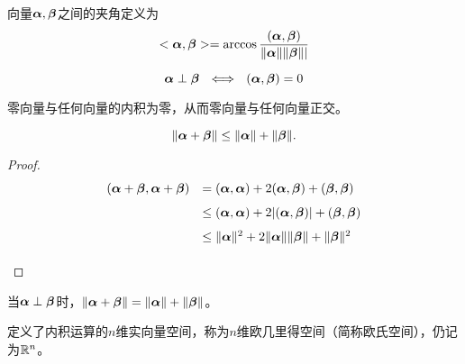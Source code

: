 \begin{frame}\ft{\secname}

\begin{dingyi}[向量之间的夹角]
  向量$\boldsymbol{\alpha},\boldsymbol{\beta}$之间的夹角定义为
  $$
  <\boldsymbol{\alpha},\boldsymbol{\beta}>=\arccos\frac{(\boldsymbol{\alpha},\boldsymbol{\beta})}{\|\boldsymbol{\alpha}\|\|\boldsymbol{\beta}\||}
  $$
\end{dingyi}
\end{frame}

\begin{frame}\ft{\secname}

\begin{dingli}
  $$\boldsymbol{\alpha}\perp\boldsymbol{\beta} ~~\Longleftrightarrow~~
  (\boldsymbol{\alpha},\boldsymbol{\beta})=0
  $$
\end{dingli}

\begin{zhu}
零向量与任何向量的内积为零，从而零向量与任何向量正交。
\end{zhu}
\end{frame}

\begin{frame}\ft{\secname}

\begin{dingli}[三角不等式]
  $$
  \|\boldsymbol{\alpha}+\boldsymbol{\beta}\|\le\|\boldsymbol{\alpha}\|+\|\boldsymbol{\beta}\|.
  $$
\end{dingli}\pause 
\begin{proof}
$$
\begin{array}{rl}
  (\boldsymbol{\alpha}+\boldsymbol{\beta},\boldsymbol{\alpha}+\boldsymbol{\beta})
  &= (\boldsymbol{\alpha},\boldsymbol{\alpha})+2(\boldsymbol{\alpha},\boldsymbol{\beta})+(\boldsymbol{\beta},\boldsymbol{\beta})\\[0.1in]
  &\le (\boldsymbol{\alpha},\boldsymbol{\alpha})+2|(\boldsymbol{\alpha},\boldsymbol{\beta})|+(\boldsymbol{\beta},\boldsymbol{\beta}) \\[0.1in]
  &\le \|\boldsymbol{\alpha}\|^2+2\|\boldsymbol{\alpha}\|\|\boldsymbol{\beta}\|+\|\boldsymbol{\beta}\|^2 \\[0.1in]
\end{array}
$$
\end{proof} \pause 


\begin{zhu}
当$\boldsymbol{\alpha}\perp\boldsymbol{\beta}$时，$\|\boldsymbol{\alpha}+\boldsymbol{\beta}\|=\|\boldsymbol{\alpha}\|+\|\boldsymbol{\beta}\|$。
\end{zhu}

\end{frame}

\begin{frame}\ft{\secname}
\begin{dingyi}[欧几里得空间]
  定义了内积运算的$n$维实向量空间，称为$n$维欧几里得空间（简称欧氏空间），仍记为$\mathbb R^n$。
\end{dingyi}
\end{frame}